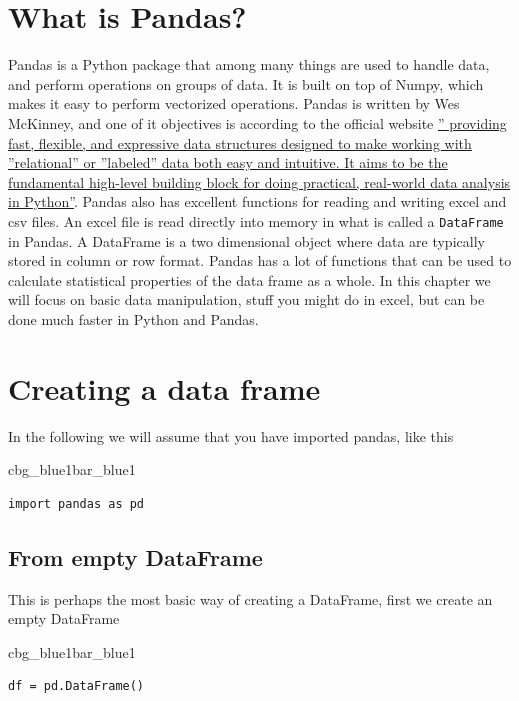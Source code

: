 \documentclass[%
oneside,                 %
final,                   %
10pt]{article}
\newenvironment{_pro_tight}[2]{
   \def\FrameCommand{\color{#2}\vrule width 1mm\normalcolor\colorbox{#1}}
   \FrameRule0.6pt\MakeFramed {\advance\hsize-2mm\FrameRestore}\vskip3mm}
   {\vskip0mm\endMakeFramed}
\newenvironment{pro}[2]{
\bgroup\rmfamily
\fboxsep=0mm\relax
\begin{_pro_tight}{#1}{#2}
\list{}{\parsep=-2mm\parskip=0mm\topsep=0pt\leftmargin=2mm
\rightmargin=2\leftmargin\leftmargin=4pt\relax}
\item\relax}
{\endlist\end{_pro_tight}\egroup}
\begin{document}
\section{What is Pandas?}
Pandas is a Python package that among many things are used to handle data, and perform operations on groups of data. It is built on top of Numpy, which makes it easy to perform vectorized operations. Pandas is written by Wes McKinney, and one of it objectives is according to the official website \href{{https://pandas.pydata.org/}}{'' providing fast, flexible, and expressive data structures designed to make working with ''relational'' or ''labeled'' data both easy and intuitive. It aims to be the fundamental high-level building block for doing practical, real-world data analysis in Python''}. Pandas also has excellent functions for reading and writing excel and csv files.  An excel file is read directly into memory in what is called a \texttt{DataFrame} in Pandas. A DataFrame is a two dimensional object where data are typically stored in column or row format. Pandas has a lot of functions that can be used to calculate statistical properties of the data frame as a whole. In this chapter we will focus on basic data manipulation, stuff you might do in excel, but can be done much faster in Python and Pandas.

\section{Creating a data frame}
In the following we will assume that you have imported pandas, like this


\begin{pro}{cbg_blue1}{bar_blue1}\begin{Verbatim}[numbers=none,fontsize=\fontsize{9pt}{9pt},baselinestretch=0.95,xleftmargin=2mm]
import pandas as pd

\end{Verbatim}
\end{pro}
\noindent


\subsection{From empty DataFrame}
This is perhaps the most basic way of creating a DataFrame, first we create an empty DataFrame


\begin{pro}{cbg_blue1}{bar_blue1}\begin{Verbatim}[numbers=none,fontsize=\fontsize{9pt}{9pt},baselinestretch=0.95,xleftmargin=2mm]
df = pd.DataFrame()

\end{Verbatim}
\end{pro}
\noindent
\end{document}
